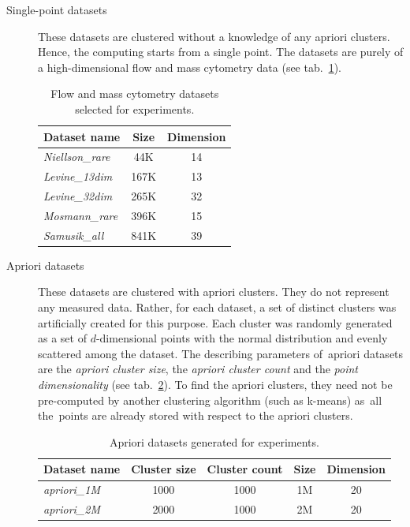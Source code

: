 \begin{description}
	\item[Single-point datasets] These datasets are clustered without a knowledge of any apriori clusters. Hence, the computing starts from a single point. The datasets are purely of a high-dimensional flow and mass cytometry data \cite{flowrepo} (see tab.~\ref{tab04:single}).
	
	\begin{table}
		\centering
		\begin{tabular}{lcc}
			\toprule
			\textbf{Dataset name} & \textbf{Size} & \textbf{Dimension} \\ \midrule
			\emph{Niellson\_rare} &      44K      &         14         \\
			\emph{Levine\_13dim}  &     167K      &         13         \\
			\emph{Levine\_32dim}  &     265K      &         32         \\
			\emph{Mosmann\_rare}  &     396K      &         15         \\
			\emph{Samusik\_all}   &     841K      &         39         \\ \bottomrule
		\end{tabular}
	\caption{Flow and mass cytometry datasets selected for experiments.}
	\label{tab04:single}
	\end{table}

	\item[Apriori datasets] These datasets are clustered with apriori clusters. They do not represent any measured data. Rather, for each dataset, a set of distinct clusters was artificially created for this purpose. Each cluster was randomly generated as a set of $d$-dimensional points with the normal distribution and evenly scattered among the dataset. The describing parameters of~apriori datasets are the \emph{apriori cluster size}, the \emph{apriori cluster count} and the \emph{point dimensionality} (see tab.~\ref{tab04:apriori}). To find the apriori clusters, they need not be pre-computed by another clustering algorithm (such as k-means) as~all the~points are already stored with respect to the apriori clusters.
	
	\begin{table}
		\centering
		\begin{tabular}{lcccc}
			\toprule
			\textbf{Dataset name} & \textbf{Cluster size} & \textbf{Cluster count} & \textbf{Size} & \textbf{Dimension} \\ \midrule
			\emph{apriori\_1M}    &         1000          &          1000          &      1M       &         20         \\
			\emph{apriori\_2M}    &         2000          &          1000          &      2M       &         20         \\ \bottomrule
		\end{tabular}
		\caption{Apriori datasets generated for experiments.}
		\label{tab04:apriori}
	\end{table}
	
\end{description}

